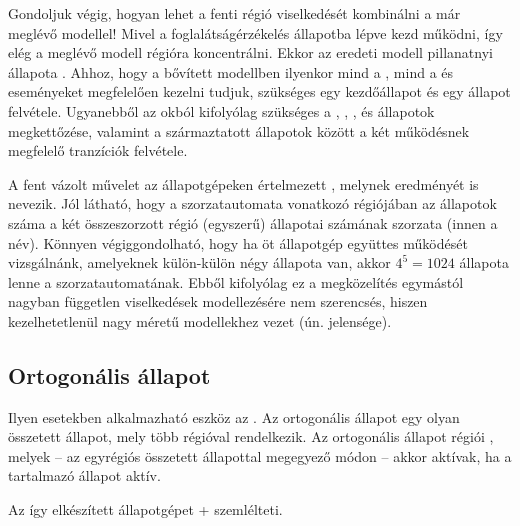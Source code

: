 Gondoljuk végig, hogyan lehet a fenti  régió viselkedését kombinálni a már meglévő modellel! Mivel a foglalátságérzékelés  állapotba lépve kezd működni, így elég a meglévő modell  régióra koncentrálni. Ekkor az eredeti modell pillanatnyi állapota . Ahhoz, hogy a bővített modellben ilyenkor mind a , mind a  és  eseményeket megfelelően kezelni tudjuk, szükséges egy  kezdőállapot és egy  állapot felvétele. Ugyanebből az okból kifolyólag szükséges a , , ,  és  állapotok megkettőzése, valamint a származtatott állapotok között a két működésnek megfelelő tranzíciók felvétele.

A fent vázolt művelet az állapotgépeken értelmezett , melynek eredményét  is nevezik. Jól látható, hogy a szorzatautomata vonatkozó régiójában az állapotok száma a két összeszorzott régió (egyszerű) állapotai számának szorzata (innen a név). Könnyen végiggondolható, hogy ha öt állapotgép együttes működését vizsgálnánk, amelyeknek külön-külön négy állapota van, akkor $4^5=1024$ állapota lenne a szorzatautomatának. Ebből kifolyólag ez a megközelítés egymástól nagyban független viselkedések modellezésére nem szerencsés, hiszen kezelhetetlenül nagy méretű modellekhez vezet (ún.  jelensége).

\subsection{Ortogonális állapot}

Ilyen esetekben alkalmazható eszköz az . Az ortogonális állapot egy olyan összetett állapot, mely több régióval rendelkezik. Az ortogonális állapot régiói , melyek -- az egyrégiós összetett állapottal megegyező módon -- akkor aktívak, ha a tartalmazó állapot aktív.

Az így elkészített állapotgépet \az+ szemlélteti.

\begin{fektetett}
\end{fektetett}

